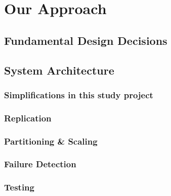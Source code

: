 \chapter{Our Approach}
\label{sec:our-approach}

\section{Fundamental Design Decisions}


\section{System Architecture}

\subsection{Simplifications in this study project}


\subsection{Replication}

\subsection{Partitioning \& Scaling}

\subsection{Failure Detection}

\subsection{Testing}
